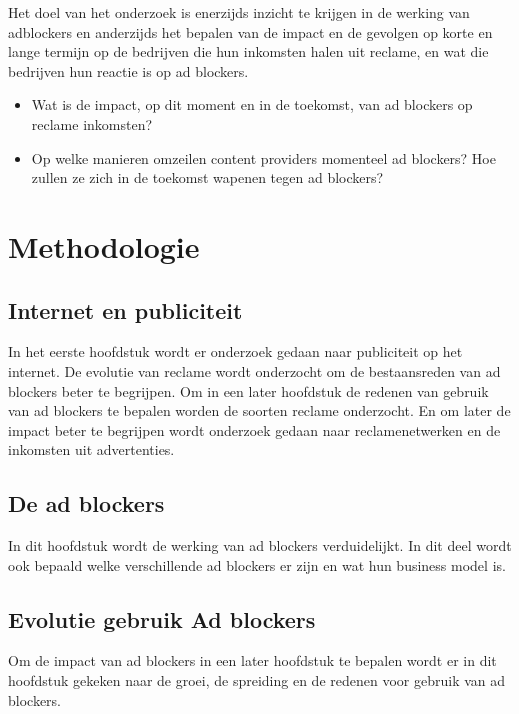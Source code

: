 \documentclass[pdftex,a4paper,12pt,twoside]{report}
\begin{document}
Het doel van het onderzoek is enerzijds inzicht te krijgen in de werking van adblockers en anderzijds het bepalen van de impact en de gevolgen op korte en lange termijn op de bedrijven die hun inkomsten halen uit reclame, en wat die bedrijven hun reactie is op ad blockers.
\begin{itemize}
	\item Wat is de impact, op dit moment en in de toekomst, van ad blockers op reclame inkomsten? 
	\item Op welke manieren omzeilen content providers momenteel ad blockers? Hoe zullen ze zich in de toekomst wapenen tegen ad blockers?
\end{itemize}



\chapter{Methodologie}
\label{ch:methodologie}
\section{Internet en publiciteit}
In het eerste hoofdstuk wordt er onderzoek gedaan naar publiciteit op het internet. De evolutie van reclame wordt onderzocht om de bestaansreden van ad blockers beter te begrijpen. Om in een later hoofdstuk de redenen van gebruik van ad blockers te bepalen worden de soorten reclame onderzocht. En om later de impact beter te begrijpen wordt onderzoek gedaan naar reclamenetwerken en de inkomsten uit advertenties.
\section{De ad blockers}
In dit hoofdstuk wordt de werking van ad blockers verduidelijkt. In dit deel wordt ook bepaald welke verschillende ad blockers er zijn en wat hun business model is.
\section{Evolutie gebruik Ad blockers}
Om de impact van ad blockers in een later hoofdstuk te bepalen wordt er in dit hoofdstuk gekeken naar de groei, de spreiding en de redenen voor gebruik van ad blockers.
\end{document}
